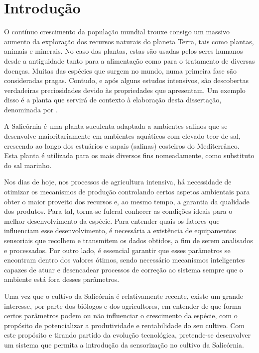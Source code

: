 \chapter{Introdução}



O contínuo crescimento da população mundial trouxe consigo um massivo aumento da exploração dos recursos naturais do planeta Terra, tais como plantas, animais e minerais. No caso das plantas, estas são usadas pelos seres humanos desde a antiguidade tanto para a alimentação como para o tratamento de diversas doenças. Muitas das espécies que surgem no mundo, numa primeira fase são consideradas pragas. Contudo, e após alguns estudos intensivos, são descobertas verdadeiras preciosidades devido às propriedades que apresentam. Um exemplo disso é a planta que servirá de contexto à elaboração desta dissertação, denominada por \sr. 



A Salicórnia é uma planta suculenta adaptada a ambientes salinos que se desenvolve maioritariamente em ambientes aquáticos com elevado teor de sal, crescendo ao longo dos estuários e sapais (salinas) costeiros do Mediterrâneo\cite{Ventura2011}. Esta planta é utilizada para os mais diversos fins nomeadamente, como substituto do sal marinho\cite{jnsalic}. 


Nos dias de hoje, nos processos de agricultura intensiva, há necessidade de otimizar os mecanismos de produção controlando certos aspetos ambientais para obter o maior proveito dos recursos e, ao mesmo tempo, a garantia da qualidade dos produtos. Para tal, torna-se fulcral conhecer as condições ideais para o melhor desenvolvimento da espécie. Para entender quais os fatores que influenciam esse desenvolvimento, é necessária a existência de equipamentos sensoriais que recolhem e transmitem os dados obtidos, a fim de serem analisados e processados. Por outro lado, é essencial garantir que esses parâmetros se encontram dentro dos valores ótimos, sendo necessário mecanismos inteligentes capazes de atuar e desencadear processos de correção ao sistema sempre que o ambiente está fora desses parâmetros. 


Uma vez que o cultivo da Salicórnia é relativamente recente, existe um grande interesse, por parte dos biólogos e dos agricultores, em entender de que forma certos parâmetros podem ou não influenciar o crescimento da espécie, com o propósito de potencializar a produtividade e rentabilidade do seu cultivo. Com este propósito e tirando partido da evolução tecnológica, pretende-se desenvolver um sistema que permita a introdução da sensorização no cultivo da Salicórnia.     


